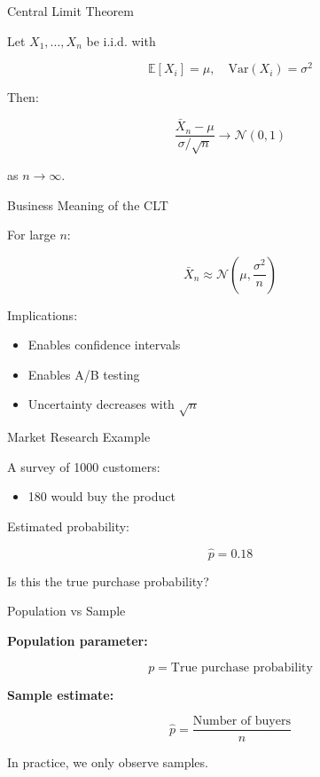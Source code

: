 \documentclass{beamer}
\begin{document}
\begin{frame}{Central Limit Theorem}

Let $X_1, \dots, X_n$ be i.i.d. with

\[
\mathbb{E}[X_i] = \mu, 
\quad
\mathrm{Var}(X_i) = \sigma^2
\]

Then:

\[
\frac{\bar{X}_n - \mu}{\sigma / \sqrt{n}}
\rightarrow \mathcal{N}(0,1)
\]

as $n \to \infty$.

\end{frame}

\begin{frame}{Business Meaning of the CLT}

For large $n$:

\[
\bar{X}_n \approx \mathcal{N}
\left(
\mu, \frac{\sigma^2}{n}
\right)
\]

\vspace{0.5cm}

Implications:

\begin{itemize}
    \item Enables confidence intervals
    \item Enables A/B testing
    \item Uncertainty decreases with $\sqrt{n}$
\end{itemize}

\end{frame}

\begin{frame}{Market Research Example}

A survey of 1000 customers:

\begin{itemize}
    \item 180 would buy the product
\end{itemize}

\vspace{0.5cm}

Estimated probability:

\[
\hat{p} = 0.18
\]

\vspace{0.5cm}

Is this the true purchase probability?

\end{frame}

\begin{frame}{Population vs Sample}

\textbf{Population parameter:}

\[
p = \text{True purchase probability}
\]

\vspace{0.5cm}

\textbf{Sample estimate:}

\[
\hat{p} = \frac{\text{Number of buyers}}{n}
\]

\vspace{0.25cm}

In practice, we only observe samples.

\end{frame}
\end{document}
